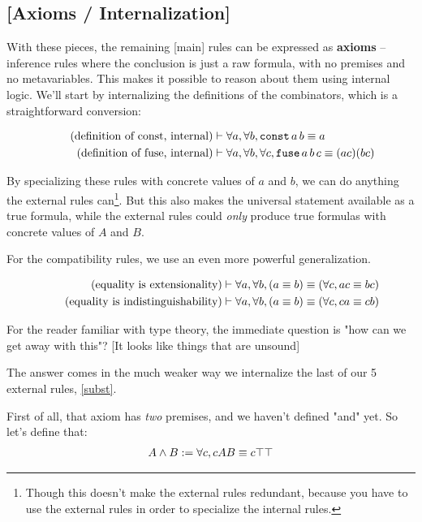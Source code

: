 \documentclass{article}
\begin{document}
  \subsection{[Axioms / Internalization]}
  
  With these pieces, the remaining [main] rules can be expressed as \textbf{axioms} – inference rules where the conclusion is just a raw formula, with no premises and no metavariables. This makes it possible to reason about them using internal logic. We'll start by internalizing the definitions of the combinators, which is a straightforward conversion:
  
  \begin{align*}
    \tag{definition of const, internal}
    &\vdash \forall a, \forall b, \operatorname{\texttt{const}} a\, b \equiv a \\
    \tag{definition of fuse, internal}
    &\vdash \forall a, \forall b, \forall c, \operatorname{\texttt{fuse}} a\, b\, c \equiv (ac)(bc)
  \end{align*}
  
  By specializing these rules with concrete values of $a$ and $b$, we can do anything the external rules can\footnote{Though this doesn't make the external rules redundant, because you have to use the external rules in order to specialize the internal rules.}. But this also makes the universal statement available as a true formula, while the external rules could \emph{only} produce true formulas with concrete values of $A$ and $B$.
  
  For the compatibility rules, we use an even more powerful generalization.
  
  \begin{align*}
    \tag{equality is extensionality}
    &\vdash \forall a, \forall b, (a \equiv b) \equiv (\forall c, ac \equiv bc) \\
    \tag{equality is indistinguishability}
    &\vdash \forall a, \forall b, (a \equiv b)  \equiv (\forall c, ca \equiv cb)
  \end{align*}
  
  For the reader familiar with type theory, the immediate question is "how can we get away with this"? [It looks like things that are unsound]
  
  The answer comes in the much weaker way we internalize the last of our 5 external rules, \eqref{subst}.
  
  First of all, that axiom has \emph{two} premises, and we haven't defined "and" yet. So let's define that:
  \begin{align*}
    A \wedge B := \forall c, cAB \equiv c\top\top
  \end{align*}
  
\end{document}
